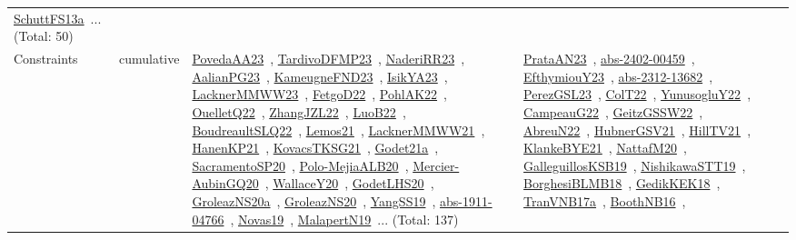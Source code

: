 {\begin{longtable}{lp{3cm}>{\raggedright\arraybackslash}p{6cm}>{\raggedright\arraybackslash}p{6cm}>{\raggedright\arraybackslash}p{8cm}}
\href{works/SchuttFS13a.pdf}{SchuttFS13a}~\cite{SchuttFS13a}... (Total: 50)\\
Constraints & cumulative & \href{works/PovedaAA23.pdf}{PovedaAA23}~\cite{PovedaAA23}, \href{works/TardivoDFMP23.pdf}{TardivoDFMP23}~\cite{TardivoDFMP23}, \href{works/NaderiRR23.pdf}{NaderiRR23}~\cite{NaderiRR23}, \href{works/AalianPG23.pdf}{AalianPG23}~\cite{AalianPG23}, \href{works/KameugneFND23.pdf}{KameugneFND23}~\cite{KameugneFND23}, \href{works/IsikYA23.pdf}{IsikYA23}~\cite{IsikYA23}, \href{works/LacknerMMWW23.pdf}{LacknerMMWW23}~\cite{LacknerMMWW23}, \href{works/FetgoD22.pdf}{FetgoD22}~\cite{FetgoD22}, \href{works/PohlAK22.pdf}{PohlAK22}~\cite{PohlAK22}, \href{works/OuelletQ22.pdf}{OuelletQ22}~\cite{OuelletQ22}, \href{works/ZhangJZL22.pdf}{ZhangJZL22}~\cite{ZhangJZL22}, \href{works/LuoB22.pdf}{LuoB22}~\cite{LuoB22}, \href{works/BoudreaultSLQ22.pdf}{BoudreaultSLQ22}~\cite{BoudreaultSLQ22}, \href{works/Lemos21.pdf}{Lemos21}~\cite{Lemos21}, \href{works/LacknerMMWW21.pdf}{LacknerMMWW21}~\cite{LacknerMMWW21}, \href{works/HanenKP21.pdf}{HanenKP21}~\cite{HanenKP21}, \href{works/KovacsTKSG21.pdf}{KovacsTKSG21}~\cite{KovacsTKSG21}, \href{works/Godet21a.pdf}{Godet21a}~\cite{Godet21a}, \href{works/SacramentoSP20.pdf}{SacramentoSP20}~\cite{SacramentoSP20}, \href{works/Polo-MejiaALB20.pdf}{Polo-MejiaALB20}~\cite{Polo-MejiaALB20}, \href{works/Mercier-AubinGQ20.pdf}{Mercier-AubinGQ20}~\cite{Mercier-AubinGQ20}, \href{works/WallaceY20.pdf}{WallaceY20}~\cite{WallaceY20}, \href{works/GodetLHS20.pdf}{GodetLHS20}~\cite{GodetLHS20}, \href{works/GroleazNS20a.pdf}{GroleazNS20a}~\cite{GroleazNS20a}, \href{works/GroleazNS20.pdf}{GroleazNS20}~\cite{GroleazNS20}, \href{works/YangSS19.pdf}{YangSS19}~\cite{YangSS19}, \href{works/abs-1911-04766.pdf}{abs-1911-04766}~\cite{abs-1911-04766}, \href{works/Novas19.pdf}{Novas19}~\cite{Novas19}, \href{works/MalapertN19.pdf}{MalapertN19}~\cite{MalapertN19}... (Total: 137) & \href{works/PrataAN23.pdf}{PrataAN23}~\cite{PrataAN23}, \href{works/abs-2402-00459.pdf}{abs-2402-00459}~\cite{abs-2402-00459}, \href{works/EfthymiouY23.pdf}{EfthymiouY23}~\cite{EfthymiouY23}, \href{works/abs-2312-13682.pdf}{abs-2312-13682}~\cite{abs-2312-13682}, \href{works/PerezGSL23.pdf}{PerezGSL23}~\cite{PerezGSL23}, \href{works/ColT22.pdf}{ColT22}~\cite{ColT22}, \href{works/YunusogluY22.pdf}{YunusogluY22}~\cite{YunusogluY22}, \href{works/CampeauG22.pdf}{CampeauG22}~\cite{CampeauG22}, \href{works/GeitzGSSW22.pdf}{GeitzGSSW22}~\cite{GeitzGSSW22}, \href{works/AbreuN22.pdf}{AbreuN22}~\cite{AbreuN22}, \href{works/HubnerGSV21.pdf}{HubnerGSV21}~\cite{HubnerGSV21}, \href{works/HillTV21.pdf}{HillTV21}~\cite{HillTV21}, \href{works/KlankeBYE21.pdf}{KlankeBYE21}~\cite{KlankeBYE21}, \href{works/NattafM20.pdf}{NattafM20}~\cite{NattafM20}, \href{works/GalleguillosKSB19.pdf}{GalleguillosKSB19}~\cite{GalleguillosKSB19}, \href{works/NishikawaSTT19.pdf}{NishikawaSTT19}~\cite{NishikawaSTT19}, \href{works/BorghesiBLMB18.pdf}{BorghesiBLMB18}~\cite{BorghesiBLMB18}, \href{works/GedikKEK18.pdf}{GedikKEK18}~\cite{GedikKEK18}, \href{works/TranVNB17a.pdf}{TranVNB17a}~\cite{TranVNB17a}, \href{works/BoothNB16.pdf}{BoothNB16}~\cite{BoothNB16}, 
\end{longtable}}
